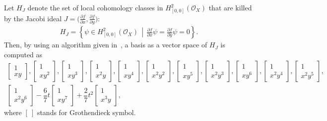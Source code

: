 \documentclass[10pt,a4paper]{amsart}
\numberwithin{equation}{section}
\begin{document}
\begin{Example}
Let $H_J $ denote the set of local cohomology classes in $ H_{[0,0]}^{2}({\mathcal O}_{X}) $ that are killed by the Jacobi ideal $J=\big (\frac{\partial f}{\partial x}, \frac{\partial f}{\partial y}\big)$:
\begin{gather*}
H_J = \left\{ \psi \in H_{[0,0]}^{2}({\mathcal O}_{X})\, \middle| \,\frac{\partial f}{\partial x}\psi = \frac{\partial f}{\partial y}\psi = 0 \right\}.
\end{gather*}
Then, by using an algorithm given in~\cite{NT17a,TNN}, a basis as a vector space of $H_J$ is computed as
\begin{gather*}
\begin{bmatrix} 1 \\ x y \end{bmatrix},
\begin{bmatrix} 1 \\ x y^2 \end{bmatrix},
\begin{bmatrix} 1 \\ x y^3 \end{bmatrix},
\begin{bmatrix} 1 \\ x^2 y \end{bmatrix},
\begin{bmatrix} 1 \\ x y^4 \end{bmatrix},
\begin{bmatrix} 1 \\ x^2 y^2 \end{bmatrix},
\begin{bmatrix} 1 \\ x y^5 \end{bmatrix},
\begin{bmatrix} 1 \\ x^2 y^3 \end{bmatrix},
\begin{bmatrix} 1 \\ x y^6 \end{bmatrix},
\begin{bmatrix} 1 \\ x ^2 y^4 \end{bmatrix},
\begin{bmatrix} 1 \\ x^2 y^5 \end{bmatrix},
\\
\begin{bmatrix} 1 \\ x^2 y^6 \end{bmatrix} -\dfrac{6}{7}t
\begin{bmatrix} 1 \\ x y^7 \end{bmatrix}+\dfrac{2}{7}t^2
\begin{bmatrix} 1 \\ x^3 y \end{bmatrix},
\end{gather*}
where $[\ ] $ stands for Grothendieck symbol.


\end{Example}
\end{document}
